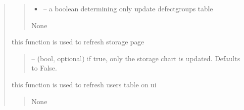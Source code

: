 \documentclass[letterpaper,10pt,english]{sphinxmanual}
\begin{document}
\begin{quote}
\begin{savenotes}
\begin{fulllineitems}
\begin{savenotes}
\begin{fulllineitems}
\begin{quote}
\begin{description}
\begin{itemize}
\item {} 
\sphinxAtStartPar
{} – a boolean determining only update defect\sphinxhyphen{}groups table

\end{itemize}

\sphinxAtStartPar
None

\end{description}\end{quote}

\end{fulllineitems}\end{savenotes}


\begin{savenotes}\begin{fulllineitems}
\label{\detokenize{setting/setting_api:oxin.setting_api.API.refresh_storege_page}}
\pysigstartsignatures
{}
\pysigstopsignatures
\sphinxAtStartPar
this function is used to refresh storage page
\begin{quote}\begin{description}
\sphinxAtStartPar
{} – (bool, optional) if true, only the storage chart is updated. Defaults to False.

\end{description}\end{quote}

\end{fulllineitems}\end{savenotes}


\begin{savenotes}\begin{fulllineitems}
\label{\detokenize{setting/setting_api:oxin.setting_api.API.refresh_users_table}}
\pysigstartsignatures
{}
\pysigstopsignatures
\sphinxAtStartPar
this function is used to refresh users table on ui
\begin{quote}\begin{description}
\sphinxAtStartPar
None


\end{description}
\end{quote}
\end{fulllineitems}
\end{savenotes}
\end{fulllineitems}
\end{savenotes}
\end{quote}
\end{document}
